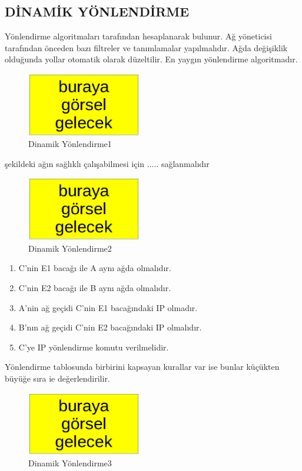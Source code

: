 \subsection{DİNAMİK YÖNLENDİRME}
Yönlendirme algoritmaları  tarafından hesaplanarak bulunur. Ağ yöneticisi tarafından önceden bazı filtreler ve tanımlamalar yapılmalıdır. Ağda değişiklik olduğunda yollar otomatik olarak düzeltilir. En yaygın yönlendirme algoritmadır.

\begin{figure}[ht]
    \centering
    \includegraphics[width=5cm]{images/BurayaGorselGelecek.png}
    \caption{Dinamik Yönlendirme1}
    \label{fig:DinamikYonlendirme1}
\end{figure}

şekildeki ağın sağlıklı çalışabilmesi için  ..... sağlanmalıdır

\begin{figure}[ht]
    \centering
    \includegraphics[width=5cm]{images/BurayaGorselGelecek.png}
    \caption{Dinamik Yönlendirme2}
    \label{fig:DinamikYonlendirme2}
\end{figure}

\begin{enumerate}
   \item C'nin E1 bacağı ile A aynı ağda olmalıdır.
   \item  C'nin E2 bacağı ile B aynı ağda olmalıdır.
   \item  A'nin ağ geçidi C'nin E1 bacağındaki IP olmadır.
   \item  B'nın ağ geçidi C'nin E2 bacağındaki IP olmalıdır.
   \item C'ye IP yönlendirme komutu verilmelidir.
\end{enumerate}

Yönlendirme tablosunda birbirini kapsayan kurallar var ise bunlar küçükten büyüğe sıra ie değerlendirilir.

\begin{figure}[ht]
    \centering
    \includegraphics[width=5cm]{images/BurayaGorselGelecek.png}
    \caption{Dinamik Yönlendirme3}
    \label{fig:DinamikYonlendirme3}
\end{figure}

